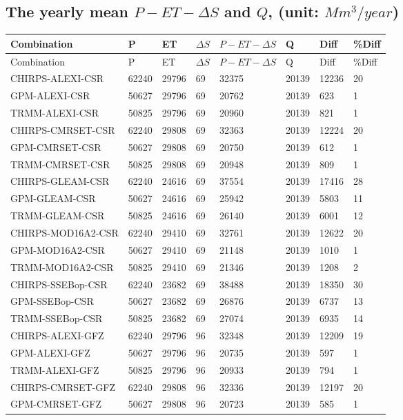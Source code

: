 \documentclass[oneside,openany]{article}%
\begin{document}
%
\clearpage%
\cleardoublepage%
\subsection{The yearly mean $P-ET-\Delta S$ and $Q$, (unit: $Mm^3/year$)}%
\label{subsec:TheyearlymeanP{-}ET{-}DeltaSandQ,(unitMm3/year)}%
\begin{longtable}{|l|l|l|l|l|l|l|l|}%
\hline%
\textbf{Combination}&\textbf{P}&\textbf{ET}&\textbf{$\Delta S$}&\textbf{$P-ET-\Delta S$}&\textbf{Q}&\textbf{Diff}&\textbf{\%Diff}\\%
\hline%
\endfirsthead%
\hline%
Combination&P&ET&$\Delta S$&$P-ET-\Delta S$&Q&Diff&\%Diff\\%
\hline%
\endhead%
\hline%
\endfoot%
CHIRPS-ALEXI-CSR&62240&29796&69&32375&20139&12236&20\\%
GPM-ALEXI-CSR&50627&29796&69&20762&20139&623&1\\%
TRMM-ALEXI-CSR&50825&29796&69&20960&20139&821&1\\%
CHIRPS-CMRSET-CSR&62240&29808&69&32363&20139&12224&20\\%
GPM-CMRSET-CSR&50627&29808&69&20750&20139&612&1\\%
TRMM-CMRSET-CSR&50825&29808&69&20948&20139&809&1\\%
CHIRPS-GLEAM-CSR&62240&24616&69&37554&20139&17416&28\\%
GPM-GLEAM-CSR&50627&24616&69&25942&20139&5803&11\\%
TRMM-GLEAM-CSR&50825&24616&69&26140&20139&6001&12\\%
CHIRPS-MOD16A2-CSR&62240&29410&69&32761&20139&12622&20\\%
GPM-MOD16A2-CSR&50627&29410&69&21148&20139&1010&1\\%
TRMM-MOD16A2-CSR&50825&29410&69&21346&20139&1208&2\\%
CHIRPS-SSEBop-CSR&62240&23682&69&38488&20139&18350&30\\%
GPM-SSEBop-CSR&50627&23682&69&26876&20139&6737&13\\%
TRMM-SSEBop-CSR&50825&23682&69&27074&20139&6935&14\\%
CHIRPS-ALEXI-GFZ&62240&29796&96&32348&20139&12209&19\\%
GPM-ALEXI-GFZ&50627&29796&96&20735&20139&597&1\\%
TRMM-ALEXI-GFZ&50825&29796&96&20933&20139&794&1\\%
CHIRPS-CMRSET-GFZ&62240&29808&96&32336&20139&12197&20\\%
GPM-CMRSET-GFZ&50627&29808&96&20723&20139&585&1\\%

\end{longtable}
\end{document}
